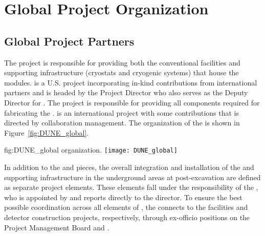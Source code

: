 \chapter{Global Project Organization}
\label{vl:tc-global}

\section{Global Project Partners}
\label{sec:partners}

The  project is responsible for providing both the conventional
facilities and supporting infrastructure (cryostats and cryogenic
systems) that house the   modules.  is a
U.S.  project incorporating in-kind contributions from
international partners and is headed by the  Project Director who
also serves as the  Deputy Director for .  The 
project is responsible for providing all components required for
fabricating the .  is an international project
with some  contributions that is directed by 
collaboration management. The organization of the  
is shown in Figure~\ref{fig:DUNE_global}.
\begin{dunefigure}{fig:DUNE_global}
  { organization.}
  \texttt{[image: DUNE\_global]}
\end{dunefigure}

In addition to the  and  pieces, the overall
integration and installation of the  and supporting
 infrastructure in the underground areas at 
post-excavation are defined as separate project elements.  These
elements fall under the responsibility of the , who is
appointed by and reports directly to the  director.  To
ensure the best possible coordination across all elements of
, the  connects to the facilities and
detector construction projects, respectively, through ex-officio
positions on the  Project Management Board and
 .

